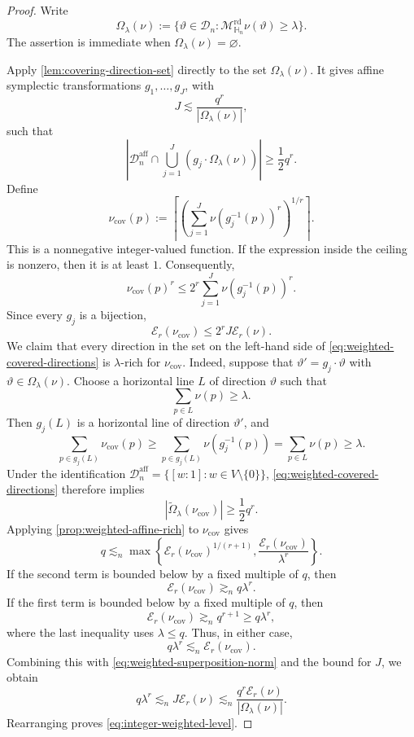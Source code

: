 \documentclass[11pt,letterpaper]{amsart}
\numberwithin{equation}{section}
\theoremstyle{definition}
\theoremstyle{remark}
\newcommand{\HH}{\mathbb H}
\newcommand{\Dn}{\mathcal D_n}
\newcommand{\Mrd}{\mathcal M^{\mathrm{rd}}_{\HH_n}}
\begin{document}
\begin{proof}
Write
\[
 \Omega_\lambda(\nu)
 :=
 \{\vartheta\in\Dn:\Mrd \nu(\vartheta)\geq\lambda\}.
\]
The assertion is immediate when $\Omega_\lambda(\nu)=\varnothing$.

Apply \cref{lem:covering-direction-set} directly to the set
$\Omega_\lambda(\nu)$.
It gives affine symplectic transformations $g_1,\ldots,g_J$, with
\[
 J\lesssim\frac{q^r}{|\Omega_\lambda(\nu)|},
\]
such that
\begin{equation}\label{eq:weighted-covered-directions}
 \left|
 \Dn^{\mathrm{aff}}\cap\bigcup_{j=1}^J(g_j\cdot\Omega_\lambda(\nu))
 \right|
 \geq\frac12q^r.
\end{equation}
Define
\begin{equation}\label{eq:weighted-superposition}
 \nu_{\mathrm{cov}}(p)
 :=
 \left\lceil
 \left(\sum_{j=1}^J\nu(g_j^{-1}(p))^r\right)^{1/r}
 \right\rceil.
\end{equation}
This is a nonnegative integer-valued function. If the expression inside the ceiling is nonzero, then it is at least $1$. Consequently,
\[
 \nu_{\mathrm{cov}}(p)^r
 \leq
 2^r\sum_{j=1}^J\nu(g_j^{-1}(p))^r.
\]
Since every $g_j$ is a bijection,
\begin{equation}\label{eq:weighted-superposition-norm}
 \mathcal E_r(\nu_{\mathrm{cov}})
 \leq
 2^rJ\mathcal E_r(\nu).
\end{equation}
We claim that every direction in the set on the left-hand side of
\eqref{eq:weighted-covered-directions} is $\lambda$-rich for
$\nu_{\mathrm{cov}}$. Indeed, suppose that $\vartheta'=g_j\cdot\vartheta$ with
$\vartheta\in\Omega_\lambda(\nu)$. Choose a
horizontal line $L$ of direction $\vartheta$ such that
\[
 \sum_{p\in L}\nu(p)\geq\lambda.
\]
Then $g_j(L)$ is a horizontal line of direction $\vartheta'$, and
\[
 \sum_{p\in g_j(L)}\nu_{\mathrm{cov}}(p)
 \geq
 \sum_{p\in g_j(L)}\nu(g_j^{-1}(p))
 =
 \sum_{p\in L}\nu(p)
 \geq\lambda.
\]
Under the identification
$\Dn^{\mathrm{aff}}=\{[w:1]: w\in V\setminus\{0\}\}$,
\eqref{eq:weighted-covered-directions} therefore implies
\[
 |\widetilde\Omega_\lambda(\nu_{\mathrm{cov}})|\geq\frac12q^r.
\]
Applying \cref{prop:weighted-affine-rich} to $\nu_{\mathrm{cov}}$ gives
\[
 q
 \lesssim_n
 \max\left\{
 \mathcal E_r(\nu_{\mathrm{cov}})^{1/(r+1)},
 \frac{\mathcal E_r(\nu_{\mathrm{cov}})}{\lambda^r}
 \right\}.
\]
If the second term is bounded below by a fixed multiple of $q$, then
\[
 \mathcal E_r(\nu_{\mathrm{cov}})
 \gtrsim_n q\lambda^r.
\]
If the first term is bounded below by a fixed multiple of $q$, then
\[
 \mathcal E_r(\nu_{\mathrm{cov}})
 \gtrsim_n q^{r+1}
 \geq q\lambda^r,
\]
where the last inequality uses $\lambda\leq q$.  Thus, in either case,
\[
 q\lambda^r
 \lesssim_n
 \mathcal E_r(\nu_{\mathrm{cov}}).
\]
Combining this with \eqref{eq:weighted-superposition-norm} and the bound
for $J$, we obtain
\[
 q\lambda^r
 \lesssim_n
 J\mathcal E_r(\nu)
 \lesssim_n
 \frac{q^r\mathcal E_r(\nu)}{|\Omega_\lambda(\nu)|}.
\]
Rearranging proves \eqref{eq:integer-weighted-level}.
\end{proof}
\end{document}
